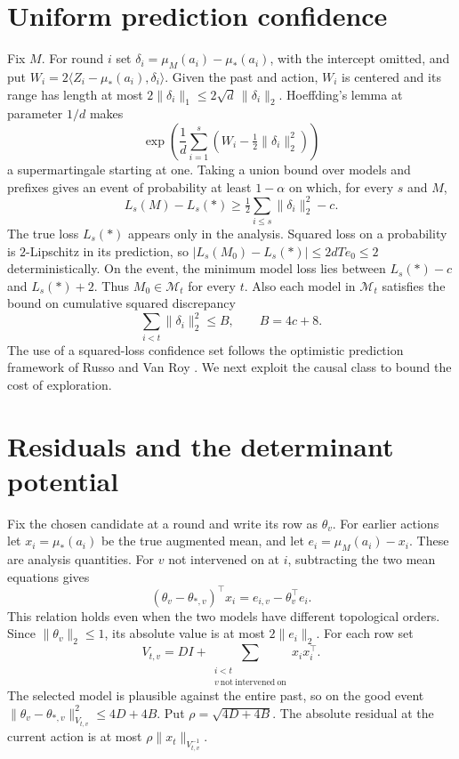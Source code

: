 \documentclass[11pt,a4paper]{amsart}
\begin{document}
\section{Uniform prediction confidence}
Fix $M$. For round $i$ set $\delta_i=\mu_M(a_i)-\mu_*(a_i)$, with the intercept omitted, and put
$W_i=2\langle Z_i-\mu_*(a_i),\delta_i\rangle$.
Given the past and action, $W_i$ is centered and its range has length at most $2\|\delta_i\|_1\leq2\sqrt d\,\|\delta_i\|_2$. Hoeffding's lemma at parameter $1/d$ makes
\[
 \exp\left(\frac1d\sum_{i=1}^s
          \left(W_i-\tfrac12\|\delta_i\|_2^2\right)\right)
\]
a supermartingale starting at one. Taking a union bound over models and prefixes gives an event of probability at least $1-\alpha$ on which, for every $s$ and $M$,
\[
 L_s(M)-L_s(*)\geq\tfrac12\sum_{i\leq s}\|\delta_i\|_2^2-c .
\]
The true loss $L_s(*)$ appears only in the analysis. Squared loss on a probability is $2$-Lipschitz in its prediction, so $|L_s(M_0)-L_s(*)|\leq2dTe_0\leq2$ deterministically. On the event, the minimum model loss lies between $L_s(*)-c$ and $L_s(*)+2$. Thus $M_0\in\mathcal M_t$ for every $t$. Also each model in $\mathcal M_t$ satisfies the bound on cumulative squared discrepancy
\[
                  \sum_{i<t}\|\delta_i\|_2^2\leq B,\qquad B=4c+8.
\]
The use of a squared-loss confidence set follows the optimistic prediction framework of Russo and Van Roy \cite{russo}. We next exploit the causal class to bound the cost of exploration.

\section{Residuals and the determinant potential}
Fix the chosen candidate at a round and write its row as $\theta_v$. For earlier actions let $x_i=\mu_*(a_i)$ be the true augmented mean, and let $e_i=\mu_M(a_i)-x_i$. These are analysis quantities. For $v$ not intervened on at $i$, subtracting the two mean equations gives
\[
         (\theta_v-\theta_{*,v})^\top x_i=e_{i,v}-\theta_v^\top e_i .
\]
This relation holds even when the two models have different topological orders. Since $\|\theta_v\|_2\leq1$, its absolute value is at most $2\|e_i\|_2$. For each row set
\[
 V_{t,v}=D I+\sum_{\substack{i<t\\v\ \mathrm{not\ intervened\ on}}}x_ix_i^\top .
\]
The selected model is plausible against the entire past, so on the good event
$\|\theta_v-\theta_{*,v}\|^2_{V_{t,v}}\leq4D+4B$. Put $\rho=\sqrt{4D+4B}$. The absolute residual at the current action is at most $\rho\|x_t\|_{V_{t,v}^{-1}}$.
\end{document}
